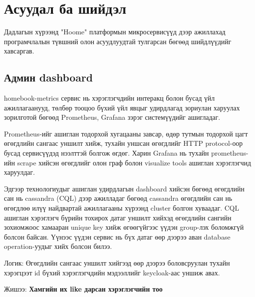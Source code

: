 \chapter{Асуудал ба шийдэл}
Дадлагын хүрээнд "Hoome" платформын микросервисүүд дээр ажиллахад програмчлалын түвшний олон асуудлуудтай тулгарсан бөгөөд шийдлүүдийг хавсаргав.
\section{Админ dashboard}
homebook-metrics сервис нь хэрэглэгчдийн интеракц болон бусад үйл ажиллагаанууд, төлбөр тооцоо бүхий үйл явцыг удирдлагад зориулан харуулах зорилготой бөгөөд  Prometheus, Grafana зэрэг системүүдийг ашигладаг. 

Prometheus-ийг ашиглан тодорхой хугацааны завсар, өдөр тутмын тодорхой цагт өгөгдлийн сангаас уншилт хийж, тухайн уншсан өгөгдлийг HTTP protocol-оор бусад сервисүүдэд нээлттэй болгож өгдөг. Харин Grafana нь тухайн prometheus-ийн scrape хийсэн өгөгдлийг олон граф болон visualize tools ашиглан хэрэглэгчид харуулдаг. 


Эдгээр технологиудыг ашиглан удирдлагын dashboard хийсэн бөгөөд өгөгдлийн сан нь cassandra (CQL) дээр ажилладаг бөгөөд cassandra өгөгдлийн сан нь өгөгдлөө илүү найдвартай ажиллагааны хүрээнд cluster болгон хуваадаг. CQL ашиглан хэрэглэгч бүрийн тохирох датаг уншилт хийхэд өгөгдлийн сангийн зохиомжоос хамааран unique key хийж өгөөгүйгээс үүдэн group-лэх боломжгүй болсон байсан. Үүнээс үүдэн сервис нь бүх датаг өөр дээрээ аван database operation-уудыг хийх болсон билээ. 

Логик: Өгөгдлийн сангаас уншилт хийгээд өөр дээрээ боловсруулан тухайн хэрэгцээт id бүхий хэрэглэгчдийн мэдээллийг keycloak-аас уншиж авах.

Жишээ: \textbf{Хамгийн их like дарсан хэрэглэгчийн тоо}

